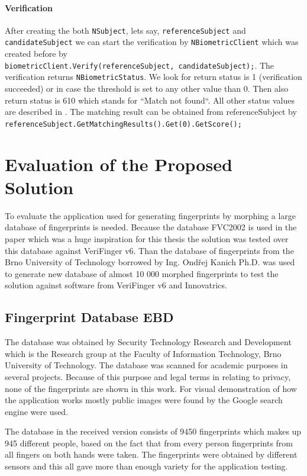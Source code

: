 \subsubsection{Verification}
After creating the both \texttt{NSubject}, lets say, \texttt{referenceSubject} and \texttt{candidateSubject} we can start the verification by \texttt{NBiometricClient} which was created before by\\ \texttt{biometricCli\-ent.Verify(referenceSubject, candidateSubject);}. The verification returns \texttt{NBiomet\-ricStatus}. We look for return status is 1 (verification succeeded) or in case the threshold is set to any other value than 0. Then also return status is 610 which stands for ``Match not found``. All other status values are described in \cite{veri12}. The matching result can be obtained from referenceSubject by\\ \texttt{referenceSubject.GetMatchingResults().Get(0).GetScore();}

\chapter{Evaluation of the Proposed Solution}
To evaluate the application used for generating fingerprints by morphing a large database of fingerprints is needed. Because the database FVC2002 is used in the paper \cite{morphing_paper} which was a huge inspiration for this thesis the solution was tested over this database against VeriFinger v6. Than the database of fingerprints from the Brno University of Technology borrowed by Ing. Ondřej Kanich Ph.D. was used to generate new database of almost 10 000 morphed fingerprints to test the solution against software from VeriFinger v6 and Innovatrics.

\section{Fingerprint Database EBD}
\label{EBD}
The database was obtained by Security Technology Research and Development which is the Research group at the Faculty of Information Technology, Brno University of Technology. The database was scanned for academic purposes in several projects. Because of this purpose and legal terms in relating to privacy, none of the fingerprints are shown in this work. For visual demonstration of how the application works mostly public images were found by the Google search engine were used.

The database in the received version consists of 9450 fingerprints which makes up 945 different people, based on the fact that from every person fingerprints from all fingers on both hands were taken. The fingerprints were obtained by different sensors and this all gave more than enough variety for the application testing.

